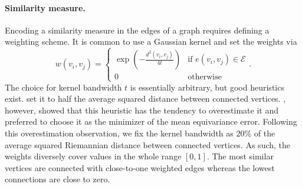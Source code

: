 \documentclass{article}
\DeclareMathOperator{\diag}{diag}
\begin{document}

\paragraph{Similarity measure.} Encoding a similarity measure in the edges of a graph requires defining a weighting scheme. It is common to use a Gaussian kernel and set the weights via
\begin{equation}
w(v_i, v_j) =
\left\{
\begin{array}{ll}
\exp \left(- \frac{d^2(v_i, v_j)}{4t}\right) & \text{if } e(v_i, v_j) \in \mathcal{E} \\
0 & \text{otherwise}
\end{array}
\right. .
\end{equation} 
The choice for kernel bandwidth $t$ is essentially arbitrary, but good heuristics exist. \citet{perraudin2019deepsphere} set it to half the average squared distance between connected vertices. \citet{defferrard2020deepsphere}, however, showed that this heuristic has the tendency to overestimate it and preferred to choose it as the minimizer of the mean equivariance error. Following this overestimation observation, we fix the kernel bandwidth as $20\%$ of the average squared Riemannian distance between connected vertices. As such, the weights diversely cover values in the whole range $[0, 1]$. The most similar vertices are connected with close-to-one weighted edges whereas the lowest connections are close to zero.
\end{document}
